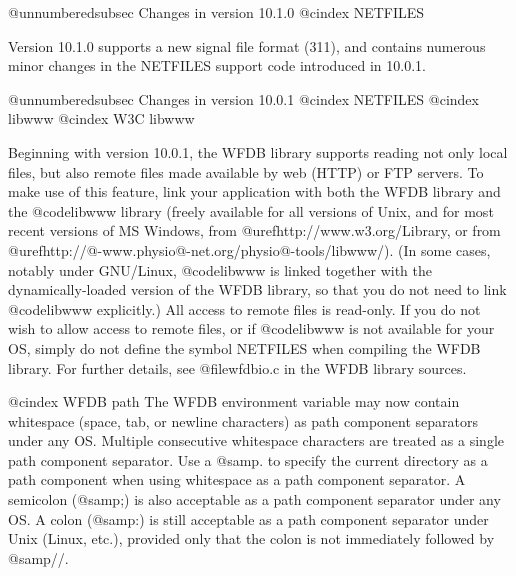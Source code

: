 @unnumberedsubsec Changes in version 10.1.0
@cindex NETFILES

Version 10.1.0 supports a new signal file format (311), and contains
numerous minor changes in the NETFILES support code introduced in 10.0.1.

@unnumberedsubsec Changes in version 10.0.1
@cindex NETFILES
@cindex libwww
@cindex W3C libwww

Beginning with version 10.0.1, the WFDB library supports reading not only local
files, but also remote files made available by web (HTTP) or FTP servers.  To
make use of this feature, link your application with both the WFDB library and
the @code{libwww} library (freely available for all versions of Unix, and for
most recent versions of MS Windows, from @uref{http://www.w3.org/Library}, or
from @uref{http://@-www.physio@-net.org/physio@-tools/libwww/}).  (In some
cases, notably under GNU/Linux, @code{libwww} is linked together with the
dynamically-loaded version of the WFDB library, so that you do not need to link
@code{libwww} explicitly.)  All access to remote files is read-only.  If you do
not wish to allow access to remote files, or if @code{libwww} is not available
for your OS, simply do not define the symbol NETFILES when compiling the WFDB
library.  For further details, see @file{wfdbio.c} in the WFDB library sources.

@cindex WFDB path
The WFDB environment variable may now contain whitespace (space, tab, or
newline characters) as path component separators under any OS.  Multiple
consecutive whitespace characters are treated as a single path component
separator.  Use a @samp{.} to specify the current directory as a path component
when using whitespace as a path component separator.  A semicolon (@samp{;}) is
also acceptable as a path component separator under any OS.  A colon (@samp{:})
is still acceptable as a path component separator under Unix (Linux, etc.),
provided only that the colon is not immediately followed by @samp{//}.

